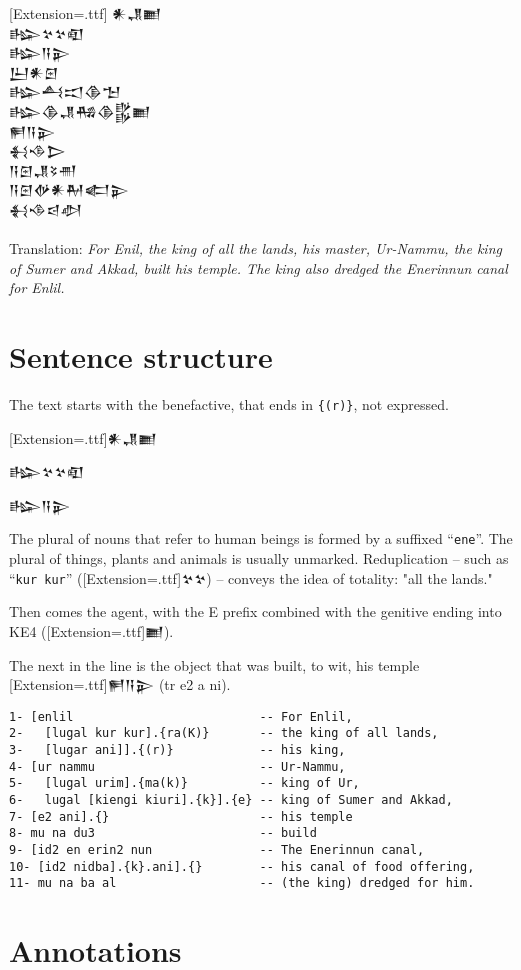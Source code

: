 \documentclass[a4paper,12pt]{book}
\newcommand{\fcn}{\setmainfont{Akkadian}[Extension=.ttf]}
\newcommand{\fsm}{\Large\setmainfont{Akkadian}[Extension=.ttf]}
\begin{document}
{\fsm
𒀭𒂗𒆤\\
𒈗𒆳𒆳𒊏\\
𒈗𒀀𒉌\\
𒌨𒀭𒇉\\
𒈗𒋀𒀊𒆠𒈠\\
𒈗𒆠𒂗𒄀𒆠𒌵𒆤\\
𒂍𒀀𒉌\\
𒈬𒈾𒆕\\
𒀀𒇉𒂗𒂟𒉣\\
𒀀𒇉𒉻𒀭𒈹𒅗𒉌\\
𒈬𒈾𒁀𒀠\\
}
\verb||\\
Translation:
{\em For Enil, the king of all the lands, his master,
  Ur-Nammu, the king of Sumer and Akkad, built his temple.
  The king also dredged the Enerinnun canal for Enlil.}

\newpage
\section{Sentence structure}
The text starts with the benefactive,
that ends in \verb|{(r)}|, not expressed.

{\fsm 𒀭𒂗𒆤

𒈗𒆳𒆳𒊏

𒈗𒀀𒉌} 

The plural of nouns that refer to human beings
is formed by a suffixed ``\verb|ene|''. The plural of things,
plants and animals is usually unmarked.
Reduplication
-- such as ``\verb|kur kur|'' ({\fcn 𒆳𒆳}) --
conveys the idea of totality: "all the lands."

Then comes the agent, with the E prefix
combined with the genitive ending
into KE4 ({\fcn 𒆤}).

The next in the line is the object that
was built, to wit, his temple {\fcn 𒂍𒀀𒉌}
(tr e2 a ni).
\begin{verbatim}
1- [enlil                          -- For Enlil,
2-   [lugal kur kur].{ra(K)}       -- the king of all lands,
3-   [lugar ani]].{(r)}            -- his king,
4- [ur nammu                       -- Ur-Nammu,
5-   [lugal urim].{ma(k)}          -- king of Ur,
6-   lugal [kiengi kiuri].{k}].{e} -- king of Sumer and Akkad,
7- [e2 ani].{}                     -- his temple
8- mu na du3                       -- build
9- [id2 en erin2 nun               -- The Enerinnun canal,
10- [id2 nidba].{k}.ani].{}        -- his canal of food offering,
11- mu na ba al                    -- (the king) dredged for him.
\end{verbatim}

\section{Annotations}
\end{document}
